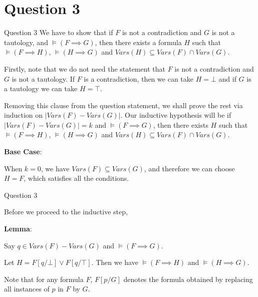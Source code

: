 \documentclass{beamer}
\begin{document}
    \section{Question 3}
    {
        \begin{frame}{Question 3}
            We have to show that if $F$ is not a contradiction and $G$ is not a tautology, and $\vDash (F \implies G)$, then there exists a formula $H$ such that $\vDash (F \implies H)$, $\vDash (H \implies G)$ and $Vars(H) \subseteq Vars(F) \cap Vars(G)$.
    
            Firstly, note that we do not need the statement that $F$ is not a contradiction and $G$ is not a tautology. If $F$ is a contradiction, then we can take $H = \bot$ and if $G$ is a tautology we can take $H = \top$.

            Removing this clause from the question statement, we shall prove the rest via induction on $|Vars(F) - Vars(G)|$. Our inductive hypothesis will be if $|Vars(F) - Vars(G)| = k$ and $\vDash (F \implies G)$, then there exists $H$ such that $\vDash (F \implies H)$, $\vDash (H \implies G)$ and $Vars(H) \subseteq Vars(F) \cap Vars(G)$.

            \textbf{Base Case}:

            When $k = 0$, we have $Vars(F) \subseteq Vars(G)$, and therefore we can choose $H = F$, which satisfies all the conditions.
        \end{frame}

        \begin{frame}{Question 3}


            
            Before we proceed to the inductive step,

            \textbf{Lemma}:


            Say $q \in Vars(F) - Vars(G)$ and $\vDash (F \implies G)$. 
            
            Let $H = F[q/\bot] \lor F[q/\top]$. Then we have $\vDash (F \implies H)$ and $\vDash (H \implies G)$.

            Note that for any formula $F$, $F[p/G]$ denotes the formula obtained by replacing all instances of $p$ in $F$ by $G$.


\end{frame}}
\end{document}

